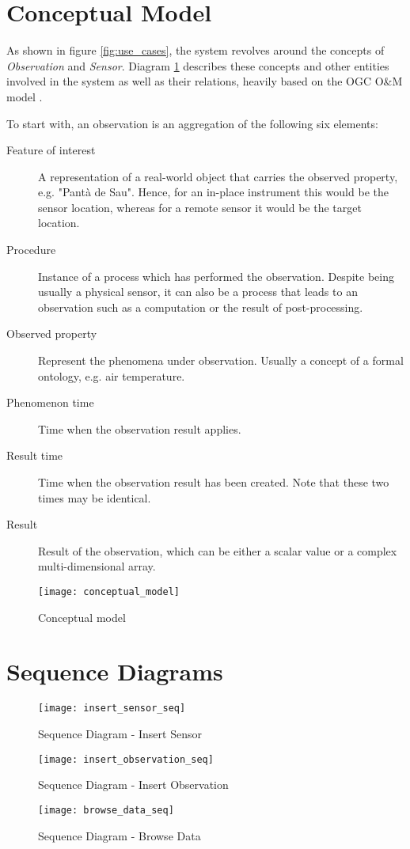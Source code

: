 \section{Conceptual Model}

As shown in figure \ref{fig:use_cases}, the system revolves around the concepts of \textit{Observation} and \textit{Sensor}. Diagram \ref{fig:conceptual_model} describes these concepts and other entities involved in the system as well as their relations, heavily based on the OGC O\&M model \cite{OM}.

To start with, an observation is an aggregation of the following six elements:

\begin{description}
\item[Feature of interest] A representation of a real-world object that carries the observed property, e.g. "Pant\`a de Sau". Hence, for an in-place instrument this would be the sensor location, whereas for a remote sensor it would be the target location.
\item[Procedure] Instance of a process which has performed the observation. Despite being usually a physical sensor, it can also be a process that leads to an observation such as a computation or the result of post-processing.
\item[Observed property] Represent the phenomena under observation. Usually a concept of a formal ontology, e.g. air temperature.
\item[Phenomenon time] Time when the observation result applies.
\item[Result time] Time when the observation result has been created. Note that these two times may be identical.
\item[Result] Result of the observation, which can be either a scalar value or a complex multi-dimensional array.
\end{description}

\begin{figure}[ht]
	\centering
	\texttt{[image: conceptual\_model]}
	\caption{Conceptual model}
	\label{fig:conceptual_model}
\end{figure}
\newpage

\section{Sequence Diagrams}

\begin{figure}[ht]
	\centering
	\texttt{[image: insert\_sensor\_seq]}
	\caption{Sequence Diagram - Insert Sensor}
	\label{fig:insert_sensor_seq}
\end{figure}

\begin{figure}[ht]
	\centering
	\texttt{[image: insert\_observation\_seq]}
	\caption{Sequence Diagram - Insert Observation}
	\label{fig:insert_observation_seq}
\end{figure}

\begin{figure}[ht]
	\centering
	\texttt{[image: browse\_data\_seq]}
	\caption{Sequence Diagram - Browse Data}
	\label{fig:browse_data_seq}
\end{figure}
